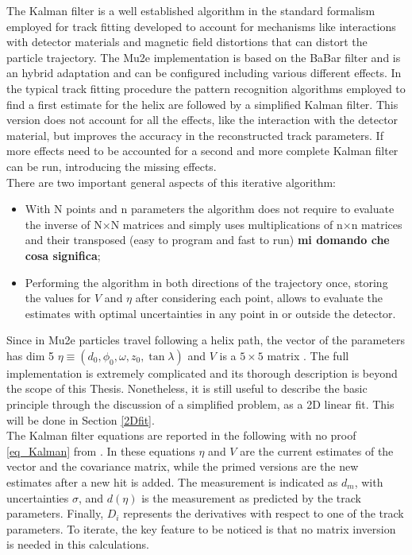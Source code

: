 \documentclass[12pt,a4paper,openright, oneside, titlepage]{book} %
\begin{document}
\noindent The Kalman filter is a well established algorithm in the standard formalism employed for track fitting developed to account for mechanisms like interactions with detector materials and magnetic field distortions that can distort the particle trajectory. 
The Mu2e implementation is based on the BaBar filter and is an hybrid adaptation \cite{Kalman} \cite{Kalman:1987} and can be configured including various different effects. 
In the typical track fitting procedure the pattern recognition algorithms employed to find a first estimate for the helix are followed by a simplified Kalman filter. 
This version does not account for all the effects, like the interaction with the detector material, but improves the accuracy in the reconstructed track parameters. 
If more effects need to be accounted for a second and more complete Kalman filter can be run, introducing the missing effects. \\
There are two important general aspects of this iterative algorithm: 
\begin{itemize}
\item With N points and n parameters the algorithm does not require to evaluate the inverse of N$\times$N matrices and simply uses multiplications of n$\times$n matrices and their transposed (easy to program and fast to run)
{\bf{mi domando che cosa significa}};
\item Performing the algorithm in both directions of the trajectory once, storing the values for $V$ and $\eta$ after considering each point, allows to evaluate the estimates with optimal uncertainties in any point in or outside the detector.
\end{itemize} 
Since in Mu2e particles travel following a helix path, the vector of the parameters has dim 5 $\eta \equiv ( d_0, \phi_0, \omega, z_0, \tan \lambda)$ and $V$ is a $5\times5$ matrix \cite{Kalman}.  
The full implementation is extremely complicated and its thorough description is beyond the scope
of this Thesis. 
Nonetheless, it is still useful to describe the basic principle through the discussion of a simplified problem, as a 2D linear fit. This will be done in Section \ref{2Dfit}.\\

\noindent
The Kalman filter equations are reported in the following with no proof \ref{eq_Kalman} from \cite{KutschkePaper}. 
In these equations $\eta$ and $V$ are the current estimates of the vector and the covariance matrix, 
while the primed versions are the new estimates after a new hit is added. 
The measurement is indicated as $d_m$, with uncertainties $\sigma$, 
and $d(\eta)$ is the measurement as predicted by the track parameters. 
Finally, $D_i$ represents the derivatives with respect to one of the track parameters. 
To iterate, the key feature to be noticed is that no matrix inversion is needed in this calculations.
\end{document}
